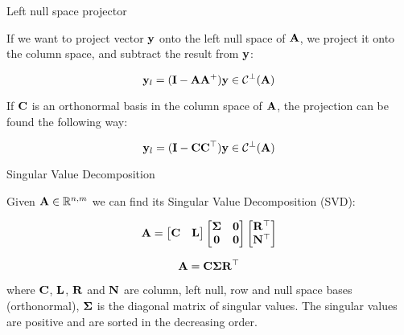 \documentclass{beamer}
\begin{document}
\begin{frame}{Left null space projector}
	\begin{flushleft}
		
		If we want to project vector $\mathbf{y}$ onto the left null space of $\mathbf{A}$, we project it onto the column space, and subtract the result from $\mathbf{y}$:
		
		\begin{equation}
			\mathbf{y}_l = (\mathbf{I} - \mathbf{A}\mathbf{A}^+) \mathbf{y} \in \mathcal{C}^\perp(\mathbf{A})
		\end{equation}
		
		If $\mathbf{C}$ is an orthonormal basis in the column space of $\mathbf{A}$, the projection can be found the following way:
		
		\begin{equation}
			\mathbf{y}_l = (\mathbf{I} - \mathbf{C}\mathbf{C}^\top) \mathbf{y} \in \mathcal{C}^\perp(\mathbf{A})
		\end{equation}
		
		
	\end{flushleft}
\end{frame}



\begin{frame}{Singular Value Decomposition}
	\begin{flushleft}
		
		Given $\mathbf{A} \in \mathbb{R}^{n, m}$ we can find its Singular Value Decomposition (SVD):
		
		\begin{equation}
			\mathbf{A} = 
			\begin{bmatrix}
				\mathbf{C} & \mathbf{L}
			\end{bmatrix}
			\begin{bmatrix}
				\mathbf{\Sigma} & \mathbf{0} \\
				\mathbf{0} & \mathbf{0}
			\end{bmatrix}
			\begin{bmatrix}
				\mathbf{R}^\top \\ \mathbf{N}^\top
			\end{bmatrix}
		\end{equation}
		
		\begin{equation}
			\mathbf{A} = 
			\mathbf{C} \mathbf{\Sigma} \mathbf{R}^\top
		\end{equation}
		
		where $\mathbf{C}$, $\mathbf{L}$, $\mathbf{R}$ and $\mathbf{N}$ are column, left null, row and null space bases (orthonormal), $\mathbf{\Sigma}$ is the diagonal matrix of singular values. The singular values are positive and are sorted in the decreasing order.
		
		
	\end{flushleft}
\end{frame}
\end{document}
